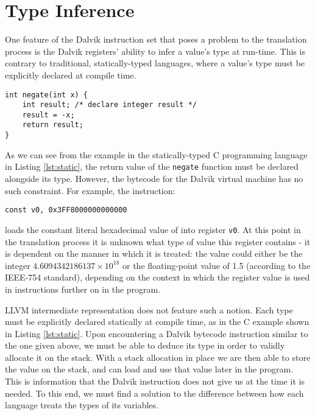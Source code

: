 \section{Type Inference}
\label{sec:typeinf}

One feature of the Dalvik instruction set that poses a problem to the translation process is the Dalvik registers' ability to infer a value's type at run-time. This is contrary to traditional, statically-typed languages, where a value's type must be explicitly declared at compile time.

\lstset{
	language=C,
	basicstyle=\small,
	stringstyle=\ttfamily
}

\begin{lstlisting}[frame=single, caption={C static typing example}, label=lst:static]
int negate(int x) {
    int result; /* declare integer result */
    result = -x;
    return result;
}
\end{lstlisting}

As we can see from the example in the statically-typed C programming language in Listing \ref{lst:static}, the return value of the \verb|negate| function must be declared alongside its type. However, the bytecode for the Dalvik virtual machine has no such constraint. For example, the instruction:

\lstset{
	language=Assembly,
	basicstyle=\small,
	stringstyle=\ttfamily
}

\begin{lstlisting}[]
const v0, 0x3FF8000000000000
\end{lstlisting}

loads the constant literal hexadecimal value of  into register \verb|v0|. At this point in the translation process it is unknown what type of value this register contains - it is dependent on the manner in which it is treated: the value could either be the integer $4.6094342186137 \times 10^{18}$ or the floating-point value of 1.5 (according to the IEEE-754 standard), depending on the context in which the register value is used in instructions further on in the program.

LLVM intermediate representation does not feature such a notion. Each type must be explicitly declared statically at compile time, as in the C example shown in Listing \ref{lst:static}. Upon encountering a Dalvik bytecode instruction similar to the one given above, we must be able to deduce its type in order to validly allocate it on the stack. With a stack allocation in place we are then able to store the value on the stack, and can load and use that value later in the program. This is information that the Dalvik instruction does not give us at the time it is needed. To this end, we must find a solution to the difference between how each language treats the types of its variables.

